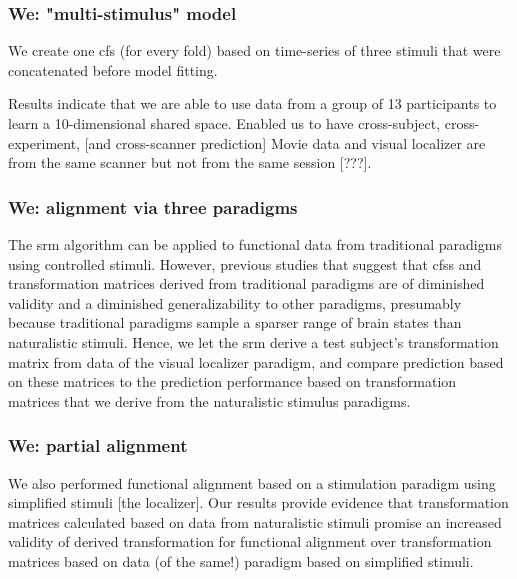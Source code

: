 \subsubsection{We: "multi-stimulus" model}

We create one \ac{cfs} (for every fold) based on time-series of three stimuli
that were concatenated before model fitting.

%
Results indicate that we are able to use data from a group of 13 participants to
learn a 10-dimensional shared space.
%
Enabled us to have cross-subject, cross-experiment, [and cross-scanner
prediction]
%
Movie data and visual localizer are from the same scanner but not from the same
session [???].


\subsubsection{We: alignment via three paradigms}

The \ac{srm} algorithm can be applied to functional data from traditional
paradigms using controlled stimuli.
%
However, previous studies \citep{guntupalli2016model, haxby2011common} that
suggest that \acp{cfs} and transformation matrices derived from traditional
paradigms are of diminished validity and a diminished generalizability to other
paradigms, presumably because traditional paradigms sample a sparser range of
brain states than naturalistic stimuli.
%
Hence, we let the \ac{srm} derive a test subject's transformation matrix from
data of the visual localizer paradigm, and compare prediction based on these
matrices to the prediction performance based on transformation matrices that
we derive from the naturalistic stimulus paradigms.


\subsubsection{We: partial alignment}


%
We also performed functional alignment based on a stimulation paradigm using
simplified stimuli [the localizer].
%
Our results provide evidence that transformation matrices calculated based on
data from naturalistic stimuli promise an increased validity of derived
transformation for functional alignment over transformation matrices based on
data (of the same!) paradigm based on simplified stimuli.



